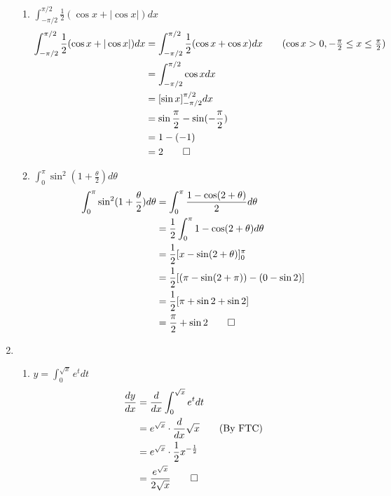 \documentclass[12pt, a4paper]{article}
\begin{document}
\begin{enumerate}[Q\arabic*.]
\begin{enumerate}[(\alph*)]
      \item $\displaystyle \int^{\pi/2}_{-\pi/2}\frac{1}{2}(\cos x + |\cos x|) dx$
        \begin{align*}
          \int^{\pi/2}_{-\pi/2}\frac{1}{2}(\cos x + |\cos x|) dx &= \int^{\pi/2}_{-\pi/2}\frac{1}{2}(\cos x + \cos x) dx\tag*{($\cos x > 0, -\frac{\pi}{2} \leq x \leq \frac{\pi}{2})$}\\
          &= \int^{\pi/2}_{-\pi/2}\cos x dx\\
          &= [\sin x]^{\pi/2}_{-\pi/2} dx\\
          &= \sin \frac{\pi}{2} - \sin(-\frac{\pi}{2}) \\
          &= 1 - (-1)\\
          &= 2 \qed
        \end{align*}
      \item $\displaystyle \int^\pi_0 \sin^2(1+\frac{\theta}{2})d\theta$
        \begin{align*}
          \int^\pi_0 \sin^2(1+\frac{\theta}{2})d\theta &= \int^\pi_0 \frac{1-\cos(2+\theta)}{2} d\theta\\
                                                       &= \frac{1}{2}\int^\pi_0 1-\cos(2+\theta) d\theta\\
                                                       &= \frac{1}{2}[x - \sin(2+\theta)]^\pi_0\\
                                                       &= \frac{1}{2}[(\pi -\sin(2+\pi)) - (0 - \sin 2)]\\
                                                       &= \frac{1}{2}[\pi +\sin 2 + \sin 2]\\
                                                       &= \frac{\pi}{2} + \sin 2 \qed 
        \end{align*}
    \end{enumerate}

  \item 
    \begin{enumerate}[(\alph*)]
    \item $\displaystyle y = \int^{\sqrt{x}}_0 e^t dt$
      \begin{align*}
        \frac{dy}{dx} &= \frac{d}{dx} \int^{\sqrt{x}}_0 e^t dt\\
                      &= e^{\sqrt{x}} \cdot \frac{d}{dx}\sqrt{x} \tag*{(By FTC)}\\
                      &= e^{\sqrt{x}} \cdot \frac{1}{2}x^{-\frac{1}{2}}\\
                      &= \frac{e^{\sqrt{x}}}{2\sqrt{x}} \qed
      \end{align*}


\end{enumerate}
\end{enumerate}
\end{document}
